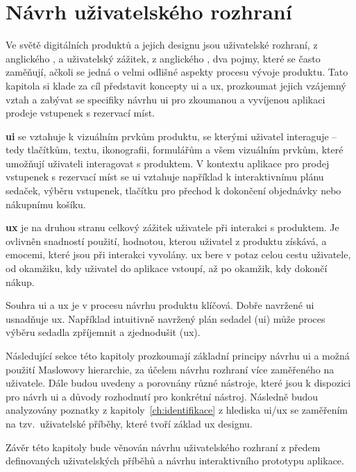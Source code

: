 \chapter{Návrh uživatelského rozhraní}
\label{ch:navrh-uzivatelskeho-rozhrani}
Ve světě digitálních produktů a jejich designu jsou uživatelské rozhraní, z anglického , a uživatelský zážitek, z anglického , dva pojmy, které se často zaměňují, ačkoli se jedná o velmi odlišné aspekty procesu vývoje produktu\cite{c_ux_design_the_difference_between_ux_and_ui_design_a_laymans_guide}.
Tato kapitola si klade za cíl představit koncepty \ac{ui} a \ac{ux}, prozkoumat jejich vzájemný vztah a zabývat se specifiky návrhu \ac{ui} pro zkoumanou a vyvíjenou aplikaci prodeje vstupenek s rezervací míst.

\textbf{\ac{ui}} se vztahuje k vizuálním prvkům produktu, se kterými uživatel interaguje – tedy tlačítkům, textu, ikonografii, formulářům a všem vizuálním prvkům, které umožňují uživateli interagovat s produktem\cite{c_ux_design_the_difference_between_ux_and_ui_design_a_laymans_guide}.
V kontextu aplikace pro prodej vstupenek s rezervací míst se \ac{ui} vztahuje například k interaktivnímu plánu sedaček, výběru vstupenek, tlačítku pro přechod k dokončení objednávky nebo nákupnímu košíku.

\textbf{\ac{ux}} je na druhou stranu celkový zážitek uživatele při interakci s produktem.
Je ovlivněn snadností použití, hodnotou, kterou uživatel z produktu získává, a emocemi, které jsou při interakci vyvolány.
\ac{ux} bere v potaz celou cestu uživatele, od okamžiku, kdy uživatel do aplikace vstoupí, až po okamžik, kdy dokončí nákup\cite{c_ux_design_the_difference_between_ux_and_ui_design_a_laymans_guide}.

Souhra \ac{ui} a \ac{ux} je v procesu návrhu produktu klíčová.
Dobře navržené \ac{ui} usnadňuje \ac{ux}.
Například intuitivně navržený plán sedadel (\ac{ui}) může proces výběru sedadla zpříjemnit a zjednodušit (\ac{ux}).

Následující sekce této kapitoly prozkoumají základní principy návrhu \ac{ui} a možná použití Maslowovy hierarchie, za účelem návrhu rozhraní více zaměřeného na uživatele.
Dále budou uvedeny a porovnány různé nástroje, které jsou k dispozici pro návrh \ac{ui} a důvody rozhodnutí pro konkrétní nástroj.
Následně budou analyzovány poznatky z kapitoly~\ref{ch:identifikace} z hlediska \ac{ui}/\ac{ux} se zaměřením na tzv.\ uživatelské příběhy, které tvoří základ \ac{ux} designu.

Závěr této kapitoly bude věnován návrhu uživatelského rozhraní z předem definovaných uživatelských příběhů a návrhu interaktivního prototypu aplikace.
